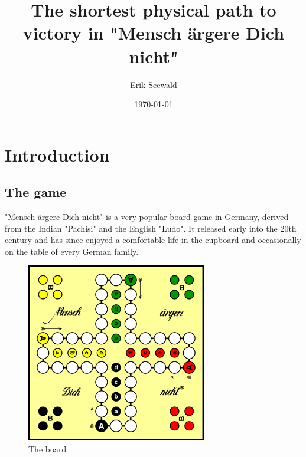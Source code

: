 \documentclass[12pt]{article} %
\title{The shortest physical path to victory in "Mensch ärgere Dich nicht"}
\author{Erik Seewald}
\date{\today}
\begin{document}
\maketitle

\tableofcontents %

\newpage

\section{Introduction}

\subsection{The game}

"Mensch ärgere Dich nicht" is a very popular board game in Germany, derived from the Indian "Pachisi" and the English "Ludo".
It released early into the 20th century and has since enjoyed a comfortable life in the cupboard and occasionally on the table
of every German family.

\begin{figure}[htbp]
    \centering
    \includegraphics[width=0.7\textwidth]{images/Figure1}
    \caption{The board}
    \label{fig:board}
\end{figure}
\end{document}
